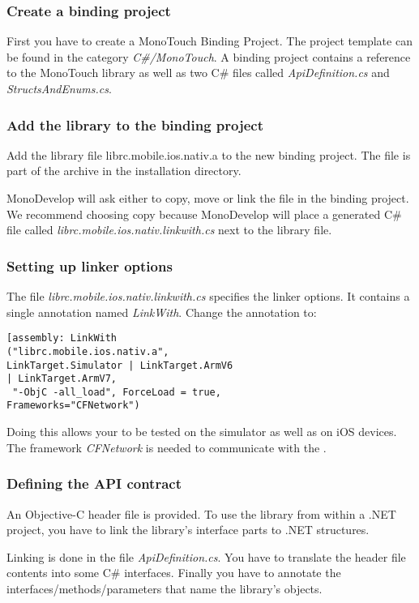 \subsubsection{Create a binding project}
First you have to create a MonoTouch Binding Project. The project template can be found in the category \emph{C\#/MonoTouch}.
A binding project contains a reference to the MonoTouch library as well as two C\# files called \emph{ApiDefinition.cs} and \emph{StructsAndEnums.cs}.

\subsubsection{Add the library to the binding project}
Add the library file librc.mobile.ios.nativ.a to the new binding project. The file is part of the archive  in the installation directory.

MonoDevelop will ask either to copy, move or link the file in the binding project. We recommend choosing copy because MonoDevelop will place a generated C\# file called \textit{librc.mobile.ios.nativ.linkwith.cs} next to the library file.

\subsubsection{Setting up linker options}
The file \textit{librc.mobile.ios.nativ.linkwith.cs} specifies the linker options. It contains a single annotation named \textit{LinkWith}.
Change the annotation to:\\
\begin{verbatim}
[assembly: LinkWith 
("librc.mobile.ios.nativ.a", 
LinkTarget.Simulator | LinkTarget.ArmV6 
| LinkTarget.ArmV7,
 "-ObjC -all_load", ForceLoad = true, 
Frameworks="CFNetwork")
\end{verbatim}
 
Doing this allows your \gdaut{} to be tested on the simulator as well as on iOS devices. The framework \textit{CFNetwork} is needed to communicate with the \ite{}.

\subsubsection{Defining the API contract}
An Objective-C header file is provided. To use the library from within a .NET project, you have to link the library's interface parts to .NET structures.

Linking is done in the file \textit{ApiDefinition.cs}. You have to translate the header file contents into some C\# interfaces. Finally you have to annotate the interfaces/methods/parameters that name the library's objects.

